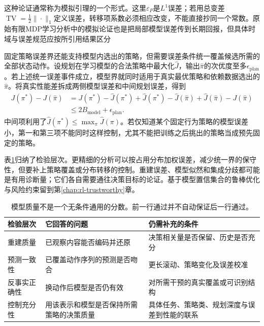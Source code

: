 这种论证通常称为模拟引理的一个形式。这里$\varepsilon_P$是$L^1$误差；若用总变差$\operatorname{TV}=\tfrac12\|\cdot\|_1$定义误差，转移项系数必须相应改变，不能直接抄同一个常数。原始有限MDP学习分析中的模拟论证也是把局部模型误差传到长期回报，但具体时域与误差规范应按所引用结果区分

固定策略误差界还能支持模型内选出的策略，但需要误差条件统一覆盖候选所需的全部状态动作。设规划在学习模型的合法策略中最大化$\widehat J$，输出$\widehat\pi$的次优度至多$\epsilon_{\mathrm{plan}}$。若上述统一误差事件成立，模型界就同时适用于真实最优策略和依赖数据选出的$\widehat\pi$。将真实性能差拆成两侧模型误差和中间规划误差，得到
\begin{align*}
  J(\pi^*)-J(\widehat\pi)
   &=J(\pi^*)-\widehat J(\pi^*)
     +\widehat J(\pi^*)-\widehat J(\widehat\pi)
     +\widehat J(\widehat\pi)-J(\widehat\pi)\\
   &\leq 2B_{\mathrm{model}}+\epsilon_{\mathrm{plan}}.
\end{align*}
中间项利用了$\widehat J(\pi^*)\leq\max_\pi\widehat J(\pi)$。若仅知道某个固定行为策略的模型误差小，第一和第三项不能同时这样控制，尤其不能把训练之后挑出的策略当成预先固定的策略。

表\ref{tab:rl-learning-model-validity}归纳了检验层次。更精细的分析可以按占用分布加权误差，减少统一界的保守性，但要补上策略覆盖或分布转移的控制。重建误差、模型似然和集成分歧都可能是有用诊断量；它们各自需要通往决策目标的论证。基于模型置信集合的鲁棒优化与风险约束留到第\ref{chap:rl-trustworthy}章。

\begin{table}[t]
  \centering
  \small
  \begin{tabularx}{\linewidth}{>{\raggedright\arraybackslash}p{24mm} >{\raggedright\arraybackslash}X >{\raggedright\arraybackslash}X}
    \toprule
    检验层次 & 它回答的问题 & 仍需补充的条件 \\
    \midrule
    重建质量 & 已观察内容能否编码并还原 & 决策相关量是否保留、历史是否充分 \\
    预测一致性 & 已覆盖动作序列的预测是否吻合 & 更长滚动、策略变化及误差校准 \\
    反事实正确性 & 换动作后模型是否仍有效 & 对所需干预的真实覆盖或可识别结构 \\
    控制充分性 & 用该表示和模型是否保持所需策略的决策质量 & 具体任务、策略类、规划深度与误差到性能的联系 \\
    \bottomrule
  \end{tabularx}
  \caption{模型质量不是一个无条件通用的分数。前一行通过并不自动保证后一行通过。}
  \label{tab:rl-learning-model-validity}
\end{table}

